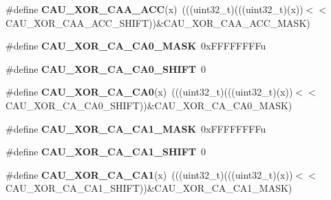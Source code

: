 \begin{DoxyCompactItemize}
\item 
\#define {\bfseries C\+A\+U\+\_\+\+X\+O\+R\+\_\+\+C\+A\+A\+\_\+\+A\+CC}(x)~(((uint32\+\_\+t)(((uint32\+\_\+t)(x))$<$$<$C\+A\+U\+\_\+\+X\+O\+R\+\_\+\+C\+A\+A\+\_\+\+A\+C\+C\+\_\+\+S\+H\+I\+FT))\&C\+A\+U\+\_\+\+X\+O\+R\+\_\+\+C\+A\+A\+\_\+\+A\+C\+C\+\_\+\+M\+A\+SK)\hypertarget{group__CAU__Register__Masks_gadef3a35dce2667f2a097ceed047bd414}{}\label{group__CAU__Register__Masks_gadef3a35dce2667f2a097ceed047bd414}

\item 
\#define {\bfseries C\+A\+U\+\_\+\+X\+O\+R\+\_\+\+C\+A\+\_\+\+C\+A0\+\_\+\+M\+A\+SK}~0x\+F\+F\+F\+F\+F\+F\+F\+Fu\hypertarget{group__CAU__Register__Masks_ga1b5b9a631549a09772404a13cc8bb2c6}{}\label{group__CAU__Register__Masks_ga1b5b9a631549a09772404a13cc8bb2c6}

\item 
\#define {\bfseries C\+A\+U\+\_\+\+X\+O\+R\+\_\+\+C\+A\+\_\+\+C\+A0\+\_\+\+S\+H\+I\+FT}~0\hypertarget{group__CAU__Register__Masks_ga668e19ef62b1ef693c25a076b8102ad1}{}\label{group__CAU__Register__Masks_ga668e19ef62b1ef693c25a076b8102ad1}

\item 
\#define {\bfseries C\+A\+U\+\_\+\+X\+O\+R\+\_\+\+C\+A\+\_\+\+C\+A0}(x)~(((uint32\+\_\+t)(((uint32\+\_\+t)(x))$<$$<$C\+A\+U\+\_\+\+X\+O\+R\+\_\+\+C\+A\+\_\+\+C\+A0\+\_\+\+S\+H\+I\+FT))\&C\+A\+U\+\_\+\+X\+O\+R\+\_\+\+C\+A\+\_\+\+C\+A0\+\_\+\+M\+A\+SK)\hypertarget{group__CAU__Register__Masks_gaf21ab1d961463e2f4288e40a44f3cb83}{}\label{group__CAU__Register__Masks_gaf21ab1d961463e2f4288e40a44f3cb83}

\item 
\#define {\bfseries C\+A\+U\+\_\+\+X\+O\+R\+\_\+\+C\+A\+\_\+\+C\+A1\+\_\+\+M\+A\+SK}~0x\+F\+F\+F\+F\+F\+F\+F\+Fu\hypertarget{group__CAU__Register__Masks_ga9aaaf6dc6a0bb9f82e566fbc29dc9f2c}{}\label{group__CAU__Register__Masks_ga9aaaf6dc6a0bb9f82e566fbc29dc9f2c}

\item 
\#define {\bfseries C\+A\+U\+\_\+\+X\+O\+R\+\_\+\+C\+A\+\_\+\+C\+A1\+\_\+\+S\+H\+I\+FT}~0\hypertarget{group__CAU__Register__Masks_gae0c5144e0bc6b1bc363388cc0724ad4a}{}\label{group__CAU__Register__Masks_gae0c5144e0bc6b1bc363388cc0724ad4a}

\item 
\#define {\bfseries C\+A\+U\+\_\+\+X\+O\+R\+\_\+\+C\+A\+\_\+\+C\+A1}(x)~(((uint32\+\_\+t)(((uint32\+\_\+t)(x))$<$$<$C\+A\+U\+\_\+\+X\+O\+R\+\_\+\+C\+A\+\_\+\+C\+A1\+\_\+\+S\+H\+I\+FT))\&C\+A\+U\+\_\+\+X\+O\+R\+\_\+\+C\+A\+\_\+\+C\+A1\+\_\+\+M\+A\+SK)\hypertarget{group__CAU__Register__Masks_ga76cb28e96e7397374f2da8d835304611}{}\label{group__CAU__Register__Masks_ga76cb28e96e7397374f2da8d835304611}


\end{DoxyCompactItemize}
